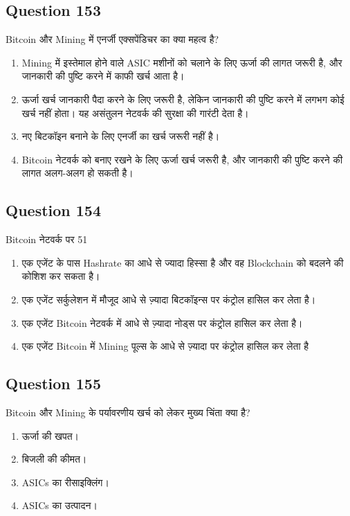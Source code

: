 \documentclass[12pt,a4paper]{article}
\begin{document}
\bigskip


\subsection*{Question 153}
Bitcoin और Mining में एनर्जी एक्सपेंडिचर का क्या महत्व है?

\begin{enumerate}[label=\Alph*., leftmargin=*]
\item Mining में इस्तेमाल होने वाले ASIC मशीनों को चलाने के लिए ऊर्जा की लागत जरूरी है, और जानकारी की पुष्टि करने में काफी खर्च आता है।
\item ऊर्जा खर्च जानकारी पैदा करने के लिए जरूरी है, लेकिन जानकारी की पुष्टि करने में लगभग कोई खर्च नहीं होता। यह असंतुलन नेटवर्क की सुरक्षा की गारंटी देता है।
\item नए बिटकॉइन बनाने के लिए एनर्जी का खर्च जरूरी नहीं है।
\item Bitcoin नेटवर्क को बनाए रखने के लिए ऊर्जा खर्च जरूरी है, और जानकारी की पुष्टि करने की लागत अलग-अलग हो सकती है।
\end{enumerate}

\bigskip


\subsection*{Question 154}
Bitcoin नेटवर्क पर 51%

\begin{enumerate}[label=\Alph*., leftmargin=*]
\item एक एजेंट के पास Hashrate का आधे से ज्यादा हिस्सा है और वह Blockchain को बदलने की कोशिश कर सकता है।
\item एक एजेंट सर्कुलेशन में मौजूद आधे से ज़्यादा बिटकॉइन्स पर कंट्रोल हासिल कर लेता है।
\item एक एजेंट Bitcoin नेटवर्क में आधे से ज़्यादा नोड्स पर कंट्रोल हासिल कर लेता है।
\item एक एजेंट Bitcoin में Mining पूल्स के आधे से ज़्यादा पर कंट्रोल हासिल कर लेता है
\end{enumerate}

\bigskip


\subsection*{Question 155}
Bitcoin और Mining के पर्यावरणीय खर्च को लेकर मुख्य चिंता क्या है?

\begin{enumerate}[label=\Alph*., leftmargin=*]
\item ऊर्जा की खपत।
\item बिजली की कीमत।
\item ASICs का रीसाइक्लिंग।
\item ASICs का उत्पादन।
\end{enumerate}
\end{document}
